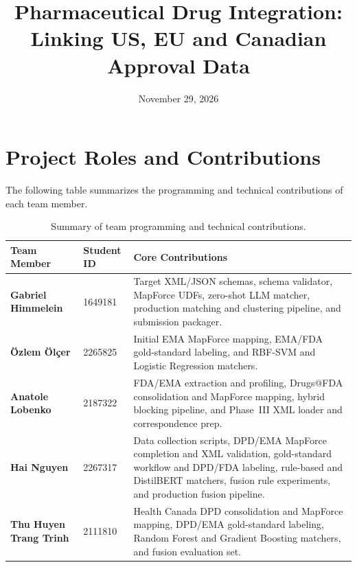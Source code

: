 \documentclass[a4paper,oneside]{scrartcl}
\title{Pharmaceutical Drug Integration:\\Linking US, EU and Canadian Approval Data}
\author{}
\date{November 29, 2026}
\begin{document}
\maketitle
\thispagestyle{empty}

\section*{Project Roles and Contributions}

The following table summarizes the programming and technical contributions of each team member.

\begin{table}[!htbp]
    \centering
    \renewcommand{\arraystretch}{1.45}
    \begin{tabularx}{\textwidth}{@{} >{\bfseries}l l P @{}}
        \toprule
        Team Member & \textbf{Student ID} & \textbf{Core Contributions} \\
        \midrule
        Gabriel Himmelein & 1649181 & Target XML/JSON schemas, schema validator, MapForce UDFs, zero-shot LLM matcher, production matching and clustering pipeline, and submission packager. \\
        \"Ozlem \"Ol\c{c}er & 2265825 & Initial EMA MapForce mapping, EMA/FDA gold-standard labeling, and RBF-SVM and Logistic Regression matchers. \\
        Anatole Lobenko & 2187322 & FDA/EMA extraction and profiling, Drugs@FDA consolidation and MapForce mapping, hybrid blocking pipeline, and Phase~III XML loader and correspondence prep. \\
        Hai Nguyen & 2267317 & Data collection scripts, DPD/EMA MapForce completion and XML validation, gold-standard workflow and DPD/FDA labeling, rule-based and DistilBERT matchers, fusion rule experiments, and production fusion pipeline. \\
        Thu Huyen Trang Trinh & 2111810 & Health Canada DPD consolidation and MapForce mapping, DPD/EMA gold-standard labeling, Random Forest and Gradient Boosting matchers, and fusion evaluation set. \\
        \bottomrule
    \end{tabularx}
    \caption{Summary of team programming and technical contributions.}
    \label{tab:team_contributions}
\end{table}
\end{document}
